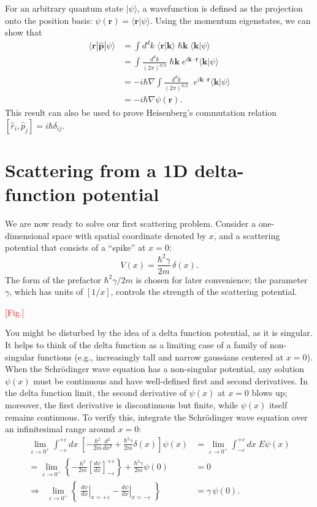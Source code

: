 \documentclass[pra,11pt]{revtex4}
\begin{document}
For an arbitrary quantum state $|\psi\rangle$, a wavefunction is
defined as the projection onto the position basis: $\psi(\mathbf{r}) =
\langle \mathbf{r}|\psi\rangle$.  Using the momentum eigenstates, we can
show that
$$\begin{aligned}\langle \mathbf{r}|\hat{\mathbf{p}}|\psi\rangle &=  \int d^dk \; \langle\mathbf{r}|\mathbf{k}\rangle \; \hbar\mathbf{k} \; \langle\mathbf{k}|\psi\rangle \\ &=  \int \frac{d^dk}{(2\pi)^{d/2}}\; \hbar\mathbf{k} \;e^{i\mathbf{k}\cdot\mathbf{r}} \langle\mathbf{k}|\psi\rangle \\ &=  -i\hbar\nabla \int \frac{d^dk}{(2\pi)^{d/2}}\; \;e^{i\mathbf{k}\cdot\mathbf{r}} \langle\mathbf{k}|\psi\rangle \\ &= -i\hbar \nabla\psi(\mathbf{r}).\end{aligned}$$
This result can also be used to prove Heisenberg's commutation relation
$[\hat{r}_i, \hat{p}_j] = i\hbar\delta_{ij}$.

\section{Scattering from a 1D delta-function potential}

We are now ready to solve our first scattering problem.  Consider a
one-dimensional space with spatial coordinate denoted by $x$, and a
scattering potential that consists of a ``spike'' at $x = 0$:
$$V(x) = \frac{\hbar^2\gamma}{2m} \,\delta(x).$$
The form of the prefactor $\hbar^2\gamma/2m$ is chosen for later
convenience; the parameter $\gamma$, which has units of $[1/x]$,
controls the strength of the scattering potential.

\textcolor{red}{[Fig.]}

You might be disturbed by the idea of a delta function potential, as
it is singular.  It helps to think of the delta function as a limiting
case of a family of non-singular functions (e.g., increasingly tall
and narrow gaussians centered at $x=0$).  When the Schr\"odinger wave
equation has a non-singular potential, any solution $\psi(x)$ must be
continuous and have well-defined first and second derivatives.  In the
delta function limit, the second derivative of $\psi(x)$ at $x=0$
blows up; moreover, the first derivative is discontinuous but finite,
while $\psi(x)$ itself remains continuous.  To verify this, integrate
the Schr\"odinger wave equation over an infinitesimal range around $x
= 0$:
$$\begin{aligned}\lim_{\varepsilon\rightarrow 0^+} \int_{-\varepsilon}^{+\varepsilon} dx\; \left[-\frac{\hbar^2}{2m} \frac{d^2}{dx^2} + \frac{\hbar^2\gamma}{2m} \delta(x)\right] \psi(x) &= \lim_{\varepsilon\rightarrow 0^+} \int_{-\varepsilon}^{+\varepsilon} dx\; E \psi(x) \\ = \lim_{\varepsilon\rightarrow 0^+} \left\{-\frac{\hbar^2}{2m} \left[\frac{d\psi}{dx}\right]_{-\varepsilon}^{+\varepsilon} \right\} + \frac{\hbar^2\gamma}{2m} \psi(0) &= 0\\ \Rightarrow \;\; \lim_{\varepsilon\rightarrow 0^+} \left\{\; \left.\frac{d\psi}{dx}\right|_{x = +\varepsilon} - \left.\frac{d\psi}{dx}\right|_{x = -\varepsilon}\; \right\}  &=  \gamma \,\psi(0).\end{aligned}$$
\end{document}
